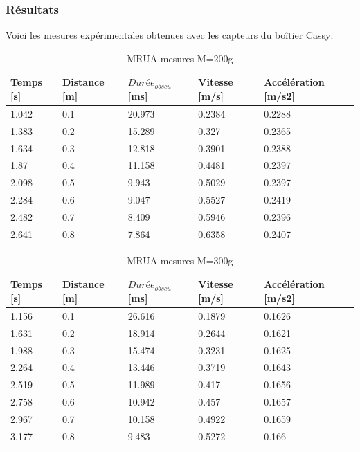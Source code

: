 \subsubsection{Résultats}

Voici les mesures expérimentales obtenues avec les capteurs du boîtier Cassy:

\begin{table}[ht]
    \centering
    \caption[MRUA mesures M=200g]{MRUA mesures M=200g}
    \begin{tabular}{|l|l|l|l|l|}
	\hline
	Temps [s]	&Distance [m]	&$Durée_{obscu}$ [ms]	&Vitesse [m/s]	&Accélération [m/s2]\\
	\hline
	1.042	&0.1	&20.973	&0.2384	&0.2288 \\
	1.383	&0.2	&15.289	&0.327	&0.2365 \\
	1.634	&0.3	&12.818	&0.3901	&0.2388 \\
	1.87	&0.4	&11.158	&0.4481	&0.2397 \\
	2.098	&0.5	&9.943	&0.5029	&0.2397 \\
	2.284	&0.6	&9.047	&0.5527	&0.2419 \\
	2.482	&0.7	&8.409	&0.5946	&0.2396 \\
	2.641	&0.8	&7.864	&0.6358	&0.2407 \\
	\hline
    \end{tabular}
\end{table}

\begin{table}[ht]
    \centering
    \caption[MRUA mesures M=300g]{MRUA mesures M=300g}
    \begin{tabular}{|l|l|l|l|l|}
	\hline
	Temps [s]	&Distance [m]	&$Durée_{obscu}$ [ms]	&Vitesse [m/s]	&Accélération [m/s2]\\
	\hline
	1.156	&0.1	&26.616	&0.1879	&0.1626 \\
	1.631	&0.2	&18.914	&0.2644	&0.1621 \\
	1.988	&0.3	&15.474	&0.3231	&0.1625 \\
	2.264	&0.4	&13.446	&0.3719	&0.1643 \\
	2.519	&0.5	&11.989	&0.417	&0.1656 \\
	2.758	&0.6	&10.942	&0.457	&0.1657 \\
	2.967	&0.7	&10.158	&0.4922	&0.1659 \\
	3.177	&0.8	&9.483	&0.5272	&0.166  \\
	\hline
    \end{tabular}
\end{table}

